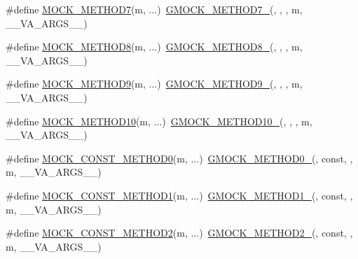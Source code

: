 \begin{DoxyCompactItemize}
\#define \hyperlink{gmock-generated-function-mockers_8h_a01f3369877a0c52f59c006fbd54b6a10}{M\+O\+C\+K\+\_\+\+M\+E\+T\+H\+O\+D7}(m, ...)~\hyperlink{gmock-generated-function-mockers_8h_ab98a8399ba62b53b375c2807f4d39d2f}{G\+M\+O\+C\+K\+\_\+\+M\+E\+T\+H\+O\+D7\+\_\+}(, , , m, \+\_\+\+\_\+\+V\+A\+\_\+\+A\+R\+G\+S\+\_\+\+\_\+)
\item 
\#define \hyperlink{gmock-generated-function-mockers_8h_ae77220bef9ab254c331b9026a3d18dba}{M\+O\+C\+K\+\_\+\+M\+E\+T\+H\+O\+D8}(m, ...)~\hyperlink{gmock-generated-function-mockers_8h_aa84a36427c44505207b7cad5dec7ad67}{G\+M\+O\+C\+K\+\_\+\+M\+E\+T\+H\+O\+D8\+\_\+}(, , , m, \+\_\+\+\_\+\+V\+A\+\_\+\+A\+R\+G\+S\+\_\+\+\_\+)
\item 
\#define \hyperlink{gmock-generated-function-mockers_8h_ad6b30841fe780994d216cc8829cc127f}{M\+O\+C\+K\+\_\+\+M\+E\+T\+H\+O\+D9}(m, ...)~\hyperlink{gmock-generated-function-mockers_8h_aa820171a19cc587c247dbe05cbffc55f}{G\+M\+O\+C\+K\+\_\+\+M\+E\+T\+H\+O\+D9\+\_\+}(, , , m, \+\_\+\+\_\+\+V\+A\+\_\+\+A\+R\+G\+S\+\_\+\+\_\+)
\item 
\#define \hyperlink{gmock-generated-function-mockers_8h_a01760fdd295f5a92264eed6a9ff1dbf8}{M\+O\+C\+K\+\_\+\+M\+E\+T\+H\+O\+D10}(m, ...)~\hyperlink{gmock-generated-function-mockers_8h_a81a48223a8771de36ef92ac6d56f6e81}{G\+M\+O\+C\+K\+\_\+\+M\+E\+T\+H\+O\+D10\+\_\+}(, , , m, \+\_\+\+\_\+\+V\+A\+\_\+\+A\+R\+G\+S\+\_\+\+\_\+)
\item 
\#define \hyperlink{gmock-generated-function-mockers_8h_ac86e04e649fa8bf35b5f0149a13c935d}{M\+O\+C\+K\+\_\+\+C\+O\+N\+S\+T\+\_\+\+M\+E\+T\+H\+O\+D0}(m, ...)~\hyperlink{gmock-generated-function-mockers_8h_ae0d290ffa58d7c624b2e3487ba1252f4}{G\+M\+O\+C\+K\+\_\+\+M\+E\+T\+H\+O\+D0\+\_\+}(, const, , m, \+\_\+\+\_\+\+V\+A\+\_\+\+A\+R\+G\+S\+\_\+\+\_\+)
\item 
\#define \hyperlink{gmock-generated-function-mockers_8h_a6f76aeb56f492cfe538e177b6aa77965}{M\+O\+C\+K\+\_\+\+C\+O\+N\+S\+T\+\_\+\+M\+E\+T\+H\+O\+D1}(m, ...)~\hyperlink{gmock-generated-function-mockers_8h_a1bc0012d62440dda77208dabdf4925c9}{G\+M\+O\+C\+K\+\_\+\+M\+E\+T\+H\+O\+D1\+\_\+}(, const, , m, \+\_\+\+\_\+\+V\+A\+\_\+\+A\+R\+G\+S\+\_\+\+\_\+)
\item 
\#define \hyperlink{gmock-generated-function-mockers_8h_a31c489715704817a3f40d178404c61e8}{M\+O\+C\+K\+\_\+\+C\+O\+N\+S\+T\+\_\+\+M\+E\+T\+H\+O\+D2}(m, ...)~\hyperlink{gmock-generated-function-mockers_8h_a885295ca6bebb15efb3fc786218c5d47}{G\+M\+O\+C\+K\+\_\+\+M\+E\+T\+H\+O\+D2\+\_\+}(, const, , m, \+\_\+\+\_\+\+V\+A\+\_\+\+A\+R\+G\+S\+\_\+\+\_\+)

\end{DoxyCompactItemize}
